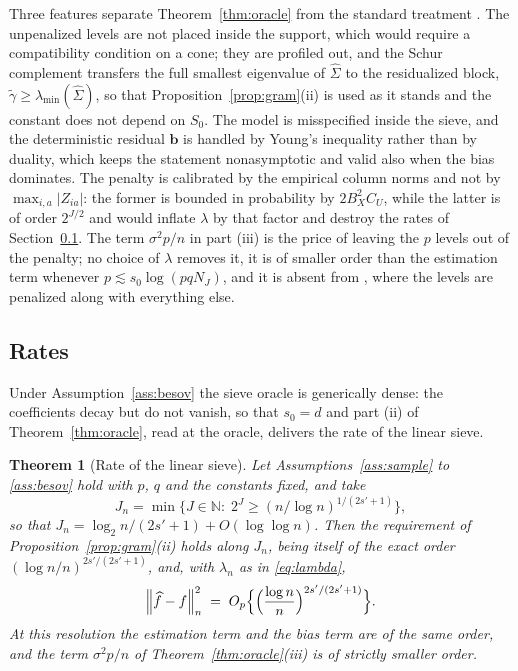 \documentclass[12pt]{article} %
\newtheorem{theorem}{Theorem}
\theoremstyle{definition}
\newcommand{\normn}[1]{\left\lVert #1 \right\rVert_{n}}
\newcommand{\NJ}{N_{J}}
\newcommand{\Gramhat}{\widehat{\Sigma}}
\newcommand{\pen}{\lambda}
\newcommand{\penn}{\lambda_{n}}
\newcommand{\Szero}{S_{0}}
\newcommand{\seff}{s'}
\newcommand{\bb}{\mathbf{b}}
\newcommand{\gtil}{\widetilde{\gamma}}
\newcommand{\lmin}{\lambda_{\min}}
\begin{document}
Three features separate Theorem~\ref{thm:oracle} from the standard treatment
\citep[Chapter 6]{buhlmann2011statistics}. The unpenalized levels are not
placed inside the support, which would require a compatibility condition on a
cone; they are profiled out, and the Schur complement transfers the full
smallest eigenvalue of $\Gramhat$ to the residualized block,
$\gtil \ge \lmin(\Gramhat)$, so that Proposition~\ref{prop:gram}(ii) is used
as it stands and the constant does not depend on $\Szero$. The model is
misspecified inside the sieve, and the deterministic residual $\bb$ is handled
by Young's inequality rather than by duality, which keeps the statement
nonasymptotic and valid also when the bias dominates. The penalty is
calibrated by the empirical column norms and not by $\max_{i,a}|Z_{ia}|$: the
former is bounded in probability by $2B_X^2C_U$, while the latter is of order
$2^{J/2}$ and would inflate $\pen$ by that factor and destroy the rates of
Section~\ref{sec:rates}. The term $\sigma^{2}p/n$ in part (iii) is the price
of leaving the $p$ levels out of the penalty; no choice of $\pen$ removes it,
it is of smaller order than the estimation term whenever
$p \lesssim s_0\log(pq\NJ)$, and it is absent from
\citet{Klopp-Pensky-2015}, where the levels are penalized along with
everything else.

\subsection{Rates}
\label{sec:rates}

Under Assumption~\ref{ass:besov} the sieve oracle is generically dense: the
coefficients decay but do not vanish, so that $s_0 = d$ and part (ii) of
Theorem~\ref{thm:oracle}, read at the oracle, delivers the rate of the linear
sieve.

\begin{theorem}[Rate of the linear sieve]
\label{thm:sieve}
Let Assumptions~\ref{ass:sample} to \ref{ass:besov} hold with $p$, $q$ and the
constants fixed, and take
\begin{equation}
  \label{eq:Jn}
  J_n = \min\bigl\{J \in \mathbb{N} :\;
  2^{J} \ge (n/\log n)^{1/(2\seff+1)}\bigr\},
\end{equation}
so that $J_n = \log_2 n/(2\seff+1) + O(\log\log n)$. Then the requirement of
Proposition~\ref{prop:gram}(ii) holds along $J_n$, being itself of the exact
order $(\log n/n)^{2\seff/(2\seff+1)}$, and, with $\penn$ as in
\eqref{eq:lambda},
\[
  \normn{\widehat{f}-f}^{2}
  \;=\; O_p\Bigl\{\Bigl(\frac{\log n}{n}\Bigr)^{2\seff/(2\seff+1)}\Bigr\} .
\]
At this resolution the estimation term and the bias term are of the same
order, and the term $\sigma^{2}p/n$ of Theorem~\ref{thm:oracle}(iii) is of
strictly smaller order.
\end{theorem}
\end{document}
